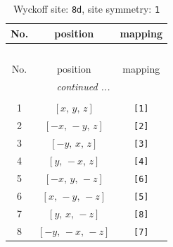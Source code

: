 \documentclass[fleqn,8pt]{jsarticle}
\begin{document}
\begin{longtable}{ccc}
\caption{Wyckoff site: {\tt 8d}, site symmetry: {\tt 1}}
 \\
 \hline \hline
No. & position & mapping \\ \hline \endfirsthead

\multicolumn{2}{l}{\tablename\ \thetable{}} \\
 \hline \hline
No. & position & mapping \\ \hline \endhead

 \hline \hline
\multicolumn{2}{r}{\footnotesize\it continued ...} \\ \endfoot

 \hline \hline
\multicolumn{2}{r}{} \\ \endlastfoot

1 & $\left[ x,\, y,\, z \right]$ & {\tt [1]} \\ \hline
2 & $\left[ - x,\, - y,\, z \right]$ & {\tt [2]} \\ \hline
3 & $\left[ - y,\, x,\, z \right]$ & {\tt [3]} \\ \hline
4 & $\left[ y,\, - x,\, z \right]$ & {\tt [4]} \\ \hline
5 & $\left[ - x,\, y,\, - z \right]$ & {\tt [6]} \\ \hline
6 & $\left[ x,\, - y,\, - z \right]$ & {\tt [5]} \\ \hline
7 & $\left[ y,\, x,\, - z \right]$ & {\tt [8]} \\ \hline
8 & $\left[ - y,\, - x,\, - z \right]$ & {\tt [7]} \\
\end{longtable}
\end{document}

